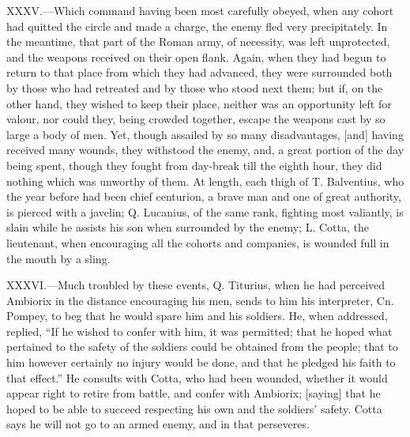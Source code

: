 XXXV.—Which command having been most carefully obeyed, when any cohort
had quitted the circle and made a charge, the enemy fled very
precipitately. In the meantime, that part of the Roman army, of
necessity, was left unprotected, and the weapons received on their open
flank. Again, when they had begun to return to that place from which
they had advanced, they were surrounded both by those who had retreated
and by those who stood next them; but if, on the other hand, they wished
to keep their place, neither was an opportunity left for valour, nor
could they, being crowded together, escape the weapons cast by so large
a body of men. Yet, though assailed by so many disadvantages, [and]
having received many wounds, they withstood the enemy, and, a great
portion of the day being spent, though they fought from day-break till
the eighth hour, they did nothing which was unworthy of them. At length,
each thigh of T. Balventius, who the year before had been chief
centurion, a brave man and one of great authority, is pierced with a
javelin; Q. Lucanius, of the same rank, fighting most valiantly, is
slain while he assists his son when surrounded by the enemy; L. Cotta,
the lieutenant, when encouraging all the cohorts and companies, is
wounded full in the mouth by a sling.

XXXVI.—Much troubled by these events, Q. Titurius, when he had
perceived Ambiorix in the distance encouraging his men, sends to him his
interpreter, Cn. Pompey, to beg that he would spare him and his
soldiers. He, when addressed, replied, ``If he wished to confer with him,
it was permitted; that he hoped what pertained to the safety of the
soldiers could be obtained from the people; that to him however
certainly no injury would be done, and that he pledged his faith to that
effect.'' He consults with Cotta, who had been wounded, whether it would
appear right to retire from battle, and confer with Ambiorix; [saying]
that he hoped to be able to succeed respecting his own and the soldiers'
safety. Cotta says he will not go to an armed enemy, and in that
perseveres.


